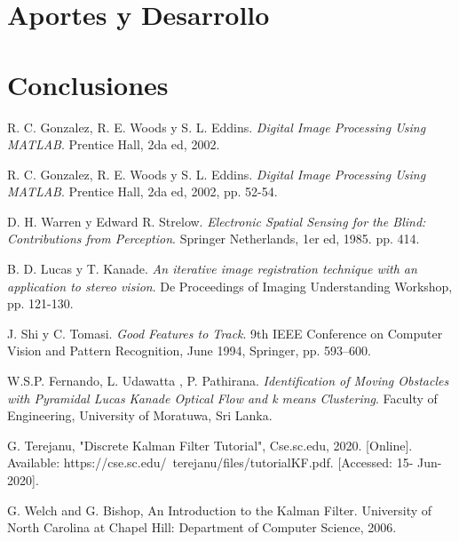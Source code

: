 \section{Aportes y Desarrollo}


%

\section{Conclusiones}


\begin{thebibliography}{9}

R. C. Gonzalez, R. E. Woods y S. L. Eddins. \textit{Digital Image Processing Using MATLAB}. Prentice Hall, 2da ed, 2002.%

R. C. Gonzalez, R. E. Woods y S. L. Eddins. \textit{Digital Image Processing Using MATLAB}. Prentice Hall, 2da ed, 2002, pp. 52-54.

D. H. Warren y Edward R. Strelow. \textit{Electronic Spatial Sensing for the Blind: Contributions from Perception}. Springer Netherlands, 1er ed, 1985. pp. 414.

B. D. Lucas y T. Kanade. \textit{An iterative image registration technique with an application to stereo vision}. De Proceedings of Imaging Understanding Workshop, pp. 121-130.

J. Shi y C. Tomasi. \textit{Good Features to Track}. 9th IEEE Conference on Computer Vision and Pattern Recognition, June 1994, Springer, pp. 593–600.

W.S.P. Fernando, L. Udawatta , P. Pathirana. \textit{Identification of Moving Obstacles with Pyramidal
Lucas Kanade Optical Flow and k means
Clustering}. Faculty of Engineering, University of Moratuwa, Sri Lanka.

G. Terejanu, "Discrete Kalman Filter Tutorial", Cse.sc.edu, 2020. [Online]. Available: https://cse.sc.edu/~terejanu/files/tutorialKF.pdf. [Accessed: 15- Jun- 2020].

G. Welch and G. Bishop, An Introduction to the Kalman Filter. University of North Carolina at Chapel Hill: Department of Computer Science, 2006.


\end{thebibliography}
